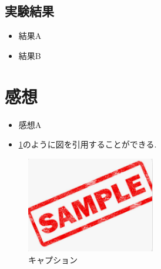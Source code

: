 \documentclass[dvipdfmx,uplatex]{jsarticle}
\theoremstyle{remark}
\begin{document}
\subsection{実験結果}
\begin{itemize}
    \item 結果A
    \item 結果B
\end{itemize}

\section{感想}
\begin{itemize}
  \item 感想A
  \item \ref{fig:template}のように図を引用することができる.
\end{itemize}

\begin{figure}
  \centering
  \includegraphics[width=0.5\textwidth]{img/image.png}
  \caption{キャプション}
  \label{fig:template}
\end{figure}



\end{document}
